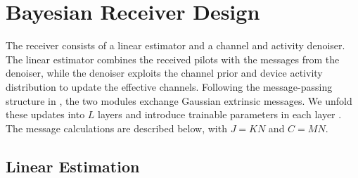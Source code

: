 \section{Bayesian Receiver Design}
\label{sec:algorithm}

The receiver consists of a linear estimator and a channel and activity
denoiser. The linear estimator combines the received pilots with the
messages from the denoiser, while the denoiser exploits the channel
prior and device activity distribution to update the effective
channels. Following the message-passing structure in
\cite{cai2026}, the two modules exchange Gaussian extrinsic messages.
We unfold these updates into $L$ layers and introduce trainable
parameters in each layer \cite{wei2026}. The message calculations
are described below, with $J=KN$ and $C=MN$.

\subsection{Linear Estimation}

